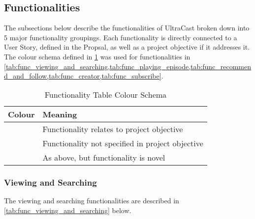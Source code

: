 \documentclass[../report.tex]{subfiles}
\begin{document}
   

\subsection{Functionalities}

The subsections below describe the functionalities of UltraCast broken down into 5
major functionality groupings. Each functionality is directly connected to a User Story,
defined in the Propsal, as well as a project objective if it addresses it. The colour 
schema defined in \cref{tab:func_table_colours} was used for functionalities in  
\cref{tab:func_viewing_and_searching,tab:func_playing_episode,tab:func_recommend_and_follow,tab:func_creator,tab:func_subscribe}.

\begin{longtable}[c]{|l|l|}
  \caption{Functionality Table Colour Schema}
  \label{tab:func_table_colours}\\
  \hline
  \rowcolor[HTML]{E2E2E2} 
  \textbf{Colour} & \textbf{Meaning} \\ \hline
  \endfirsthead
  \endhead
  \cellcolor[HTML]{FFFDD1} & Functionality relates to project objective \\ \hline
  \cellcolor[HTML]{FAFAFA} & Functionality not specified in project objective \\ \hline
  \cellcolor[HTML]{E8FBFF} & As above, but functionality is novel \\ \hline
\end{longtable}

\subsubsection{Viewing and Searching}

The viewing and searching functionalities are described in \cref{tab:func_viewing_and_searching} below.
\end{document}
